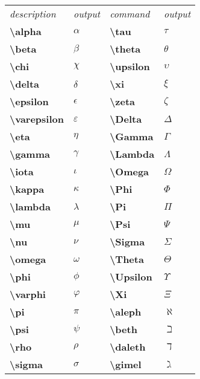 \documentclass{article}
\begin{document}
\begin{table}[H]
 \begin{tabular}{llll}
  \textit{description} &\textit{output} &\textit{command} &\textit{output}\\
  \textbf{\textbackslash alpha} &$\alpha$ &\textbf{\textbackslash tau} &$\tau$\\
  \textbf{\textbackslash beta} &$\beta$ &\textbf{\textbackslash theta} &$\theta$\\
  \textbf{\textbackslash chi} &$\chi$ &\textbf{\textbackslash upsilon} &$\upsilon$\\
  \textbf{\textbackslash delta} &$\delta$ &\textbf{\textbackslash xi} &$\xi$\\
  \textbf{\textbackslash epsilon} &$\epsilon$ &\textbf{\textbackslash zeta} &$\zeta$\\
  \textbf{\textbackslash varepsilon} &$\varepsilon$ &\textbf{\textbackslash Delta} &$\Delta$\\
  \textbf{\textbackslash eta} &$\eta$ &\textbf{\textbackslash Gamma} &$\Gamma$\\
  \textbf{\textbackslash gamma} &$\gamma$ &\textbf{\textbackslash Lambda} &$\Lambda$\\
  \textbf{\textbackslash iota} &$\iota$ &\textbf{\textbackslash Omega} &$\Omega$\\
  \textbf{\textbackslash kappa} &$\kappa$ &\textbf{\textbackslash Phi} &$\Phi$\\
  \textbf{\textbackslash lambda} &$\lambda$ &\textbf{\textbackslash Pi} &$\Pi$\\
  \textbf{\textbackslash mu} &$\mu$ &\textbf{\textbackslash Psi} &$\Psi$\\
  \textbf{\textbackslash nu} &$\nu$ &\textbf{\textbackslash Sigma} &$\Sigma$\\
  \textbf{\textbackslash omega} &$\omega$ &\textbf{\textbackslash Theta} &$\Theta$\\
  \textbf{\textbackslash phi} &$\phi$ &\textbf{\textbackslash Upsilon} &$\Upsilon$\\
  \textbf{\textbackslash varphi} &$\varphi$ &\textbf{\textbackslash Xi} &$\Xi$\\
  \textbf{\textbackslash pi} &$\pi$ &\textbf{\textbackslash aleph} &$\aleph$\\
  \textbf{\textbackslash psi} &$\psi$ &\textbf{\textbackslash beth} &$\beth$\\
  \textbf{\textbackslash rho} &$\rho$ &\textbf{\textbackslash daleth} &$\daleth$\\
  \textbf{\textbackslash sigma} &$\sigma$ &\textbf{\textbackslash gimel} &$\gimel$\\
 \end{tabular}
\end{table}
\end{document}
